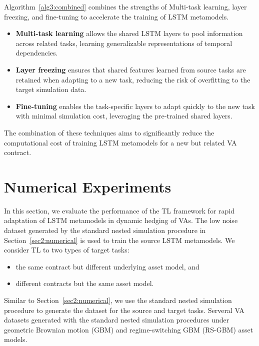 Algorithm~\ref{alg3:combined} combines the strengths of Multi-task learning, layer freezing, and fine-tuning to accelerate the training of LSTM metamodels. 

\begin{itemize}
    \item \textbf{Multi-task learning} allows the shared LSTM layers to pool information across related tasks, learning generalizable representations of temporal dependencies.
    \item \textbf{Layer freezing} ensures that shared features learned from source tasks are retained when adapting to a new task, reducing the risk of overfitting to the target simulation data.
    \item \textbf{Fine-tuning} enables the task-specific layers to adapt quickly to the new task with minimal simulation cost, leveraging the pre-trained shared layers.
\end{itemize}
    
The combination of these techniques aims to significantly reduce the computational cost of training LSTM metamodels for a new but related VA contract.

\section{Numerical Experiments} \label{sec3:experiments}

In this section, we evaluate the performance of the TL framework for rapid adaptation of LSTM metamodels in dynamic hedging of VAs.
The low noise dataset generated by the standard nested simulation procedure in Section~\ref{sec2:numerical} is used to train the source LSTM metamodels.
We consider TL to two types of target tasks: 
\begin{itemize}
    \item the same contract but different underlying asset model, and
    \item different contracts but the same asset model.
\end{itemize}  
Similar to Section~\ref{sec2:numerical}, we use the standard nested simulation procedure to generate the dataset for the source and target tasks.
Serveral VA datasets generated with the standard nested simulation procedures under geometric Brownian motion (GBM) and regime-switching GBM (RS-GBM) asset models.

